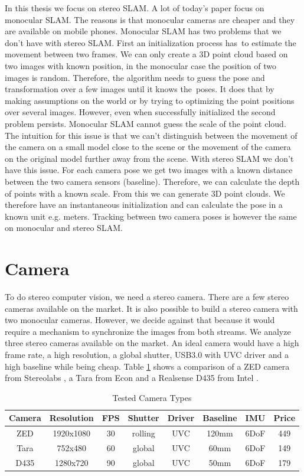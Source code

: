 \documentclass[11pt,a4paper,titlepage,oneside]{report}
\begin{document}
In this thesis we focus on stereo SLAM. A lot of today's paper focus on monocular SLAM. The reasons is that monocular cameras are cheaper and they are available on mobile phones. Monocular SLAM has two problems that we don’t have with stereo SLAM. First an initialization process has to estimate the movement between two frames. We can only create a 3D point cloud based on two images with known position, in the monocular case the position of two images is random. Therefore, the algorithm needs to guess the pose and transformation over a few images until it knows the poses. It does that by making assumptions on the world or by trying to optimizing the point positions over several images. However, even when successfully initialized the second problem persists. Monocular SLAM cannot guess the scale of the point cloud. The intuition for this issue is that we can’t distinguish between the movement of the camera on a small model close to the scene or the movement of the camera on the original model further away from the scene. With stereo SLAM we don’t have this issue. For each camera pose we get two images with a known distance between the two camera sensors (baseline). Therefore, we can calculate the depth of points with a known scale. From this we can generate 3D point clouds. We therefore have an instantaneous initialization and can calculate the pose in a known unit e.g. meters. Tracking between two camera poses is however the same on monocular and stereo SLAM.

\section{Camera}

To do stereo computer vision, we need a stereo camera. There are a few stereo cameras available on the market. It is also possible to build a stereo camera with two monocular cameras. However, we decide against that because it would require a mechanism to synchronize the images from both streams. We analyze three stereo cameras available on the market. An ideal camera would have a high frame rate, a high resolution, a global shutter, USB3.0 with UVC driver and a high baseline while being cheap. Table \ref{tab:cameras} shows a comparison of a ZED camera from Stereolabs \cite{zed}, a Tara from Econ \cite{tara} and a Realsense D435 from Intel \cite{realsense}.

\tiny
\begin{table}[H]
  \centering
  \begin{tabular}{|c|c|c|c|c|c|c|c|}
  Camera & Resolution & FPS & Shutter & Driver & Baseline & IMU & Price \\
  \hline
  ZED & 1920x1080 & 30 & rolling &  UVC & 120mm & 6DoF & 449\\
  Tara & 752x480& 60 & global &  UVC &  60mm & 6DoF & 149\\
  D435 & 1280x720& 90 & global & UVC &  50mm & 6DoF & 179\\
\end{tabular}
\caption{Tested Camera Types}
\label{tab:cameras}
\end{table}
\normalsize
\end{document}
